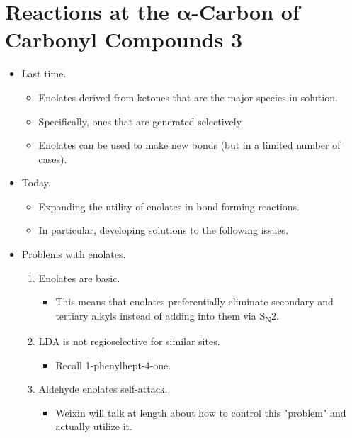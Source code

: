 \documentclass[../notes.tex]{subfiles}
\begin{document}
\section[Reactions at the \texorpdfstring{$\alpha$}{TEXT}-Carbon of Carbonyl Compounds 3]{Reactions at the \texorpdfstring{$\bm{\alpha}$}{TEXT}-Carbon of Carbonyl Compounds 3}
\begin{itemize}
    \item {}Last time.
    \begin{itemize}
        \item Enolates derived from ketones that are the major species in solution.
        \item Specifically, ones that are generated selectively.
        \item Enolates can be used to make new  bonds (but in a limited number of cases).
    \end{itemize}
    \item Today.
    \begin{itemize}
        \item Expanding the utility of enolates in  bond forming reactions.
        \item In particular, developing solutions to the following issues.
    \end{itemize}
    \item Problems with enolates.
    \begin{enumerate}
        \item Enolates are basic.
        \begin{itemize}
            \item This means that enolates preferentially eliminate secondary and tertiary alkyls instead of adding into them via S\textsubscript{N}2.
        \end{itemize}
        \item LDA is not regioselective for similar sites.
        \begin{itemize}
            \item Recall 1-phenylhept-4-one.
        \end{itemize}
        \item Aldehyde enolates self-attack.
        \begin{itemize}
            \item Weixin will talk at length about how to control this "problem" and actually utilize it.
        \end{itemize}
    \end{enumerate}

\end{itemize}
\end{document}
